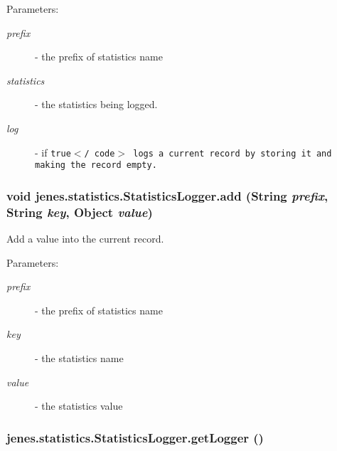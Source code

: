 \begin{Desc}
\item[Parameters:]
\begin{description}
\item[{\em prefix}]- the prefix of statistics name \item[{\em statistics}]- the statistics being logged. \item[{\em log}]- if {\tt true$<$/ code$>$ logs a current record by storing it and making the record empty. }\end{description}
\end{Desc}
\hypertarget{classjenes_1_1statistics_1_1_statistics_logger_c9ee13346b299296f315ad6cf247fdcf}{
\subsubsection[add]{\setlength{\rightskip}{0pt plus 5cm}void jenes.statistics.StatisticsLogger.add (String {\em prefix}, \/  String {\em key}, \/  Object {\em value})}}
\label{classjenes_1_1statistics_1_1_statistics_logger_c9ee13346b299296f315ad6cf247fdcf}


Add a value into the current record.

\begin{Desc}
\item[Parameters:]
\begin{description}
\item[{\em prefix}]- the prefix of statistics name \item[{\em key}]- the statistics name \item[{\em value}]- the statistics value \end{description}
\end{Desc}
\hypertarget{classjenes_1_1statistics_1_1_statistics_logger_bd8fdfad668108933aa315c415050d63}{
\subsubsection[getLogger]{ jenes.statistics.StatisticsLogger.getLogger ()}}
\label{classjenes_1_1statistics_1_1_statistics_logger_bd8fdfad668108933aa315c415050d63}


